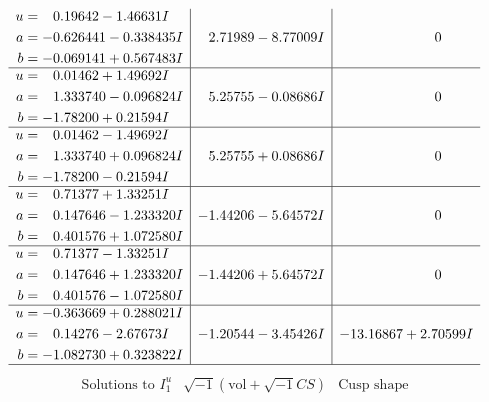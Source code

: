 \documentclass[1p]{elsarticle_modified}
\theoremstyle{definition}
\newcommand{\I}{\sqrt{-1}}
\begin{document}
$$\begin{array}{c|c|c}
\begin{aligned}
u &= \phantom{-}0.19642 - 1.46631 I \\
a &= -0.626441 - 0.338435 I \\
b &= -0.069141 + 0.567483 I\end{aligned}
 & \phantom{-}2.71989 - 8.77009 I & \phantom{-0.000000 } 0 \\ \hline\begin{aligned}
u &= \phantom{-}0.01462 + 1.49692 I \\
a &= \phantom{-}1.333740 - 0.096824 I \\
b &= -1.78200 + 0.21594 I\end{aligned}
 & \phantom{-}5.25755 - 0.08686 I & \phantom{-0.000000 } 0 \\ \hline\begin{aligned}
u &= \phantom{-}0.01462 - 1.49692 I \\
a &= \phantom{-}1.333740 + 0.096824 I \\
b &= -1.78200 - 0.21594 I\end{aligned}
 & \phantom{-}5.25755 + 0.08686 I & \phantom{-0.000000 } 0 \\ \hline\begin{aligned}
u &= \phantom{-}0.71377 + 1.33251 I \\
a &= \phantom{-}0.147646 - 1.233320 I \\
b &= \phantom{-}0.401576 + 1.072580 I\end{aligned}
 & -1.44206 - 5.64572 I & \phantom{-0.000000 } 0 \\ \hline\begin{aligned}
u &= \phantom{-}0.71377 - 1.33251 I \\
a &= \phantom{-}0.147646 + 1.233320 I \\
b &= \phantom{-}0.401576 - 1.072580 I\end{aligned}
 & -1.44206 + 5.64572 I & \phantom{-0.000000 } 0 \\ \hline\begin{aligned}
u &= -0.363669 + 0.288021 I \\
a &= \phantom{-}0.14276 - 2.67673 I \\
b &= -1.082730 + 0.323822 I\end{aligned}
 & -1.20544 - 3.45426 I & -13.16867 + 2.70599 I\\
 \hline 
 \end{array}$$\newpage$$\begin{array}{c|c|c}  
\text{Solutions to }I^u_{1}& \I (\text{vol} + \sqrt{-1}CS) & \text{Cusp shape}\\
 \hline 
\begin{aligned}

\end{aligned}
\end{array}$$
\end{document}
